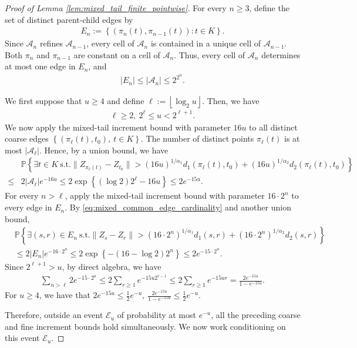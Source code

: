 \documentclass[10pt,a4paper]{amsart}
\newcommand{\PP}{\mathbb{P}}
\newcommand{\cE}{\mathcal{E}}
\newcommand{\cbr}[1]{\left\{#1\right\}}
\newcommand{\floor}[1]{\left\lfloor#1\right\rfloor}
\begin{document}
\begin{proof}[Proof of Lemma
\ref{lem:mixed_tail_finite_pointwise}]
For every $n\ge3$, define the set of distinct parent-child edges by
\begin{align*}
E_n
:=
\cbr{
(\pi_n(t),\pi_{n-1}(t)):
t\in K
}.
\end{align*}
Since $\mathcal A_n$ refines $\mathcal A_{n-1}$, every cell of
$\mathcal A_n$ is contained in a unique cell of
$\mathcal A_{n-1}$. Both $\pi_n$ and $\pi_{n-1}$ are constant on a
cell of $\mathcal A_n$. Thus, every cell of $\mathcal A_n$ determines
at most one edge in $E_n$, and
\begin{align}
|E_n|
\le
|\mathcal A_n|
\le
2^{2^n}.
\label{eq:mixed_common_edge_cardinality}
\end{align}

We first suppose that $u\ge4$ and define $\ell:=\floor{\log_2u}$. Then, we have
\begin{align*}
\ell\ge2,
\ 
2^\ell\le u<2^{\ell+1}.
\end{align*}
We now apply the mixed-tail increment bound with parameter $16u$ to all
distinct coarse edges $\cbr{(\pi_\ell(t),t_0),
\ t\in K}$. The number of distinct points $\pi_\ell(t)$ is at most
$|\mathcal A_\ell|$. Hence, by a union bound, we have
\begin{align*}
&\PP\left\{
\exists t\in K\ \text{s.t.} \|Z_{\pi_\ell(t)}-Z_{t_0}\|
>
(16u)^{1/\alpha_1}
d_1(\pi_\ell(t),t_0)
+
(16u)^{1/\alpha_2}
d_2(\pi_\ell(t),t_0)
\right\}\\
\le&2|\mathcal A_\ell|e^{-16u}\le
2\exp\cbr{(\log2)2^\ell-16u}\le
2e^{-15u}.
\end{align*}
For every $n>\ell$, apply the mixed-tail increment bound with parameter
$16\cdot2^n$ to every edge in $E_n$. By
\eqref{eq:mixed_common_edge_cardinality} and another union bound,
\begin{align*}
&\PP\left\{\exists (s,r)\in E_n\ \text{s.t.}\|Z_s-Z_r\|
>
(16\cdot2^n)^{1/\alpha_1}d_1(s,r)
+
(16\cdot2^n)^{1/\alpha_2}d_2(s,r)
\right\}\\
&\le
2|E_n|e^{-16\cdot2^n}\le
2\exp\cbr{-(16-\log2)2^n}\le
2e^{-15\cdot2^n}.
\end{align*}
Since $2^{\ell+1}>u$, by direct algebra, we have
\begin{align*}
\sum_{n>\ell}2e^{-15\cdot2^n}\le
2\sum_{r\ge1}e^{-15u2^{r-1}}\le
2\sum_{r\ge1}e^{-15ur}=
\frac{2e^{-15u}}{1-e^{-15u}}.
\end{align*}
For $u\ge4$,  we have that $2e^{-15u}
\le
\frac12e^{-u},
\ 
\frac{2e^{-15u}}{1-e^{-15u}}
\le
\frac12e^{-u}$. 

Therefore, outside an event $\cE_u$ of probability at most $e^{-u}$,
all the preceding coarse and fine increment bounds hold
simultaneously. We now work conditioning on this event $\cE_u$. 


\end{proof}
\end{document}
